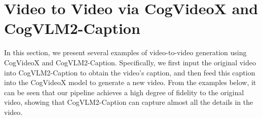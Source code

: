 \clearpage
\section{Video to Video via CogVideoX and CogVLM2-Caption}
\label{ap:v2v}

In this section, we present several examples of video-to-video generation using CogVideoX and CogVLM2-Caption. Specifically, we first input the original video into CogVLM2-Caption to obtain the video's caption, and then feed this caption into the CogVideoX model to generate a new video. From the examples below, it can be seen that our pipeline achieves a high degree of fidelity to the original video, showing that CogVLM2-Caption can capture almost all the details in the video.




